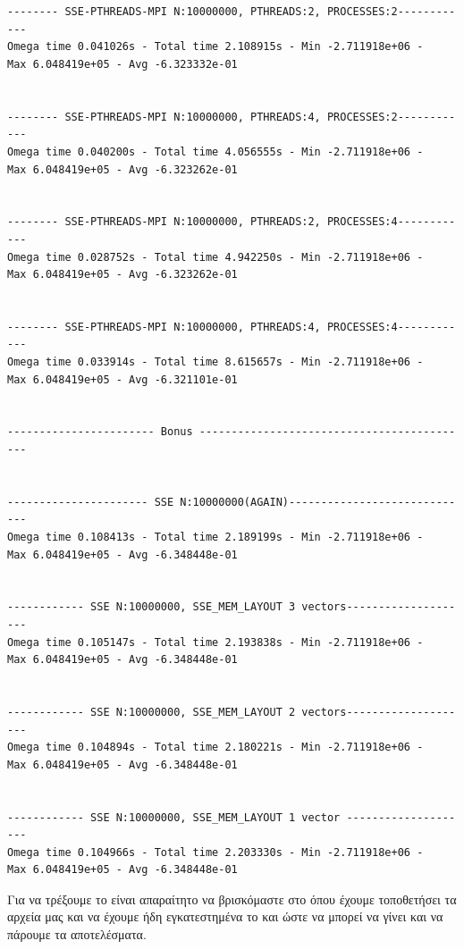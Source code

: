 \documentclass{article}
\begin{document}
\begin{commandline}
      \begin{verbatim}


-------- SSE-PTHREADS-MPI N:10000000, PTHREADS:2, PROCESSES:2------------
Omega time 0.041026s - Total time 2.108915s - Min -2.711918e+06 - 
Max 6.048419e+05 - Avg -6.323332e-01


-------- SSE-PTHREADS-MPI N:10000000, PTHREADS:4, PROCESSES:2------------
Omega time 0.040200s - Total time 4.056555s - Min -2.711918e+06 - 
Max 6.048419e+05 - Avg -6.323262e-01


-------- SSE-PTHREADS-MPI N:10000000, PTHREADS:2, PROCESSES:4------------
Omega time 0.028752s - Total time 4.942250s - Min -2.711918e+06 - 
Max 6.048419e+05 - Avg -6.323262e-01


-------- SSE-PTHREADS-MPI N:10000000, PTHREADS:4, PROCESSES:4------------
Omega time 0.033914s - Total time 8.615657s - Min -2.711918e+06 - 
Max 6.048419e+05 - Avg -6.321101e-01


----------------------- Bonus -------------------------------------------


---------------------- SSE N:10000000(AGAIN)-----------------------------
Omega time 0.108413s - Total time 2.189199s - Min -2.711918e+06 - 
Max 6.048419e+05 - Avg -6.348448e-01


------------ SSE N:10000000, SSE_MEM_LAYOUT 3 vectors--------------------
Omega time 0.105147s - Total time 2.193838s - Min -2.711918e+06 - 
Max 6.048419e+05 - Avg -6.348448e-01


------------ SSE N:10000000, SSE_MEM_LAYOUT 2 vectors--------------------
Omega time 0.104894s - Total time 2.180221s - Min -2.711918e+06 - 
Max 6.048419e+05 - Avg -6.348448e-01


------------ SSE N:10000000, SSE_MEM_LAYOUT 1 vector --------------------
Omega time 0.104966s - Total time 2.203330s - Min -2.711918e+06 - 
Max 6.048419e+05 - Avg -6.348448e-01

      \end{verbatim}
\end{commandline}

\begin{warn}[Σημείωση:]
  Για να τρέξουμε το  είναι απαραίτητο να βρισκόμαστε στο  όπου έχουμε τοποθετήσει τα αρχεία μας και να έχουμε ήδη εγκατεστημένα το  και  ώστε να μπορεί να γίνει  και να πάρουμε τα αποτελέσματα.
\end{warn}
\end{document}

